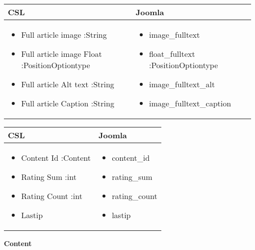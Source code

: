 \begin{minipage}{0.65\textwidth}
\begin{tabular}{|p{} | p{}|}
\hline
\textbf{CSL} & \textbf{Joomla} \\ 
\hline
\begin{itemize}
\item Full article image :String
\item Full article image Float :PositionOptiontype
\item Full article  Alt text :String
\item Full article Caption :String
\end{itemize}
 & 
 \begin{itemize}
\item image\_fulltext 
\item float\_fulltext :PositionOptiontype
\item image\_fulltext\_alt 
\item image\_fulltext\_caption
 \end{itemize}
\\
\hline
\end{tabular}
\end{minipage}

\begin{minipage}{0.7\textwidth}
\begin{tabular}{|p{} | p{}|}
\hline
\textbf{CSL} & \textbf{Joomla} \\ 
\hline
\begin{itemize}
\item Content Id :Content
\item Rating Sum :int
\item Rating Count :int
\item Lastip
\end{itemize}
 & 
\begin{itemize}
\item content\_id
\item rating\_sum
\item rating\_count
\item lastip
\end{itemize}
\\
\hline
\end{tabular}
\end{minipage}

\textbf{Content}

